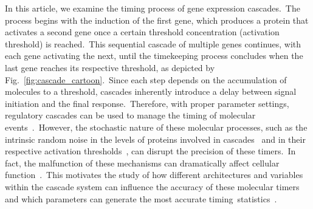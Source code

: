 \documentclass[aps,prb,reprint,superscriptaddress]{revtex4-2}
\begin{document}
In this article, we examine the timing process of gene expression cascades.~The process begins with the induction of the first gene, which produces a protein that activates a second gene once a certain threshold concentration (activation threshold) is reached.~This sequential cascade of multiple genes continues, with each gene activating the next, until the timekeeping process concludes when the last gene reaches its respective threshold, as depicted by Fig.~\ref{fig:cascade_cartoon}.~Since each step depends on the accumulation of molecules to a threshold, cascades inherently introduce a delay between signal initiation and the final response.~Therefore, with proper parameter settings, regulatory cascades can be used to manage the timing of molecular events~\cite{pedraza2007random,ali2022controlling}.~However, the stochastic nature of these molecular processes, such as the intrinsic random noise in the levels of proteins involved in cascades~\cite{eldar2010functional} and in their respective activation thresholds~\cite{co2017stochastic,biswas2016redundancy}, can disrupt the precision of these timers.~In fact, the malfunction of these mechanisms can dramatically affect cellular function~\cite{nachman2007dissecting}.~This motivates the study of how different architectures and variables within the cascade system can influence the accuracy of these molecular timers and which parameters can generate the most accurate timing~statistics~\cite{thattai2002attenuation}.
\end{document}
